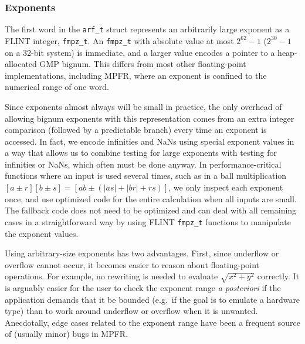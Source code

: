 \documentclass[10pt,journal,compsoc,cspaper]{IEEEtran}
\begin{document}

\subsubsection{Exponents}

The first word in the \texttt{arf\_t} struct represents
an arbitrarily large exponent as a FLINT integer, \texttt{fmpz\_t}.
An \texttt{fmpz\_t} with absolute value at most $2^{62}-1$ ($2^{30}-1$
on a 32-bit system) is immediate,
and a larger value encodes a pointer to a heap-allocated GMP bignum.
This differs from most other floating-point implementations,
including MPFR, where an exponent is confined to the numerical
range of one word.

Since exponents almost always will be small in practice, the
only overhead of allowing bignum exponents with this representation
comes from an extra integer comparison (followed by a predictable branch)
every time an exponent is accessed.
In fact, we encode infinities and NaNs using special exponent values
in a way that allows us to combine testing for large exponents
with testing for infinities or NaNs, which often must be done anyway.
In performance-critical functions where an input is used several times,
such as in a ball multiplication $[a \pm r] [b \pm s] = [ab \pm (|as| + |br| + rs)]$,
we only inspect each exponent once, and
use optimized code for the entire calculation
when all inputs are small.
The fallback code does not need to be optimized and can deal
with all remaining cases in a straightforward way
by using FLINT \texttt{fmpz\_t} functions to manipulate
the exponent values.

Using arbitrary-size exponents has two advantages.
First, since underflow or overflow cannot occur,
it becomes easier to reason about floating-point operations.
For example, no rewriting is needed to
evaluate $\sqrt{x^2 + y^2}$ correctly.
It is arguably easier for the user to check the exponent range \textit{a posteriori}
if the application demands that it be bounded (e.g.\ if the goal is to emulate a hardware type)
than to work around underflow or overflow when it is unwanted.
Anecdotally, edge cases related to the exponent range have been
a frequent source of (usually minor) bugs in MPFR.
\end{document}
